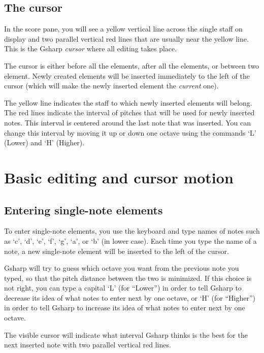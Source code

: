 \documentclass[11pt]{book}
\def\gs{Gsharp}
\def\kbd#1{`#1'}
\def\command#1{``#1''}
\begin{document}
\section{The cursor}

In the score pane, you will see a yellow vertical line across the
single staff on display and two parallel vertical red lines that are
usually near the yellow line.  This is the {\gs}
\emph{cursor} where all editing takes place.

The cursor is either before all the elements, after all the elements,
or between two element.  Newly created elements will be inserted
immediately to the left of the cursor (which will make the newly
inserted element the \emph{current} one). 

The yellow line indicates the staff to which newly inserted elements
will belong.  The red lines indicate the interval of pitches that will
be used for newly inserted notes.  This interval is centered around
the last note that was inserted.  You can change this interval by
moving it up or down one octave using the commands \kbd{L} (Lower) and
\kbd{H} (Higher). 

\chapter{Basic editing and cursor motion}

\section{Entering single-note elements}

To enter single-note elements, you use the keyboard and type names of
notes such as \kbd{c}, \kbd{d}, \kbd{e}, \kbd{f}, \kbd{g}, \kbd{a}, or
\kbd{b} (in lower case).  Each time you type the name of a note, a new
single-note element will be inserted to the left of the cursor.

{\gs} will try to guess which octave you want from the previous note
you typed, so that the pitch distance between the two is minimized.
If this choice is not right, you can type a capital \kbd{L} (for
\command{Lower}) in order to tell {\gs} to decrease its idea of what
notes to enter next by one octave, or \kbd{H} (for \command{Higher})
in order to tell {\gs} to increase its idea of what notes to enter
next by one octave.

The visible cursor will indicate what interval {\gs} thinks is the
best for the next inserted note with two parallel vertical red lines. 
\end{document}
